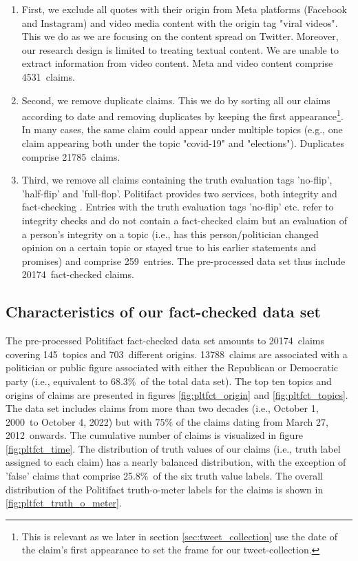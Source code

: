 \documentclass[
10pt, %
a4paper, %
oneside, %
headinclude,footinclude, %
] {book}%
\newcommand{\pltfctMETA}{4531}
\newcommand{\pltfctDUPS}{21785}
\newcommand{\pltfctFLIPFLOP}{259}
\newcommand{\pltfctTOTAL}{20174}
\newcommand{\pltfctTOPICS}{145}
\newcommand{\pltfctORIGINS}{703}
\newcommand{\pltfctFROMDATE}{October 1, 2000}
\newcommand{\pltfctTODATE}{October 4, 2022}
\newcommand{\pltfctMOSTDATE}{March 27, 2012}
\newcommand{\pltfctDEMREPS}{13788}
\newcommand{\pltfctDEMREPSPCT}{68.3\%}
\newcommand{\pltfctFALSECLAIMSPCT}{25.8\%}
\begin{document}
\begin{enumerate}
    \item First, we exclude all quotes with their origin from Meta platforms (Facebook and Instagram) and video media content with the origin tag "viral videos". This we do as we are focusing on the content spread on Twitter. Moreover, our research design is limited to treating textual content. We are unable to extract information from video content. Meta and video content comprise \pltfctMETA\ claims.
    \item Second, we remove duplicate claims. This we do by sorting all our claims according to date and removing duplicates by keeping the first appearance\footnote{This is relevant as we later in section \ref{sec:tweet_collection} use the date of the claim's first appearance to set the frame for our tweet-collection.}. In many cases, the same claim could appear under multiple topics (e.g., one claim appearing both under the topic "covid-19" and "elections"). Duplicates comprise \pltfctDUPS\ claims.
    \item Third, we remove all claims containing the truth evaluation tags 'no-flip', 'half-flip' and 'full-flop'. Politifact provides two services, both integrity and fact-checking \citep{politifact_methodology}. Entries with the truth evaluation tags 'no-flip' etc. refer to integrity checks and do not contain a fact-checked claim but an evaluation of a person's integrity on a topic (i.e., has this person/politician changed opinion on a certain topic or stayed true to his earlier statements and promises) and comprise \pltfctFLIPFLOP\ entries. The pre-processed data set thus include \pltfctTOTAL\ fact-checked claims.
\end{enumerate}
  

\subsection{Characteristics of our fact-checked data set}
\label{subsec:fact-checked_data_set}

The pre-processed Politifact fact-checked data set amounts to \pltfctTOTAL\ claims covering \pltfctTOPICS\ topics and \pltfctORIGINS\ different origins. \pltfctDEMREPS\ claims are associated with a politician or public figure associated with either the Republican or Democratic party (i.e., equivalent to \pltfctDEMREPSPCT\ of the total data set). The top ten topics and origins of claims are presented in figures \ref{fig:pltfct_origin} and \ref{fig:pltfct_topics}. The data set includes claims from more than two decades (i.e., \pltfctFROMDATE\ to \pltfctTODATE\.) but with 75\% of the claims dating from \pltfctMOSTDATE\ onwards. The cumulative number of claims is visualized in figure \ref{fig:pltfct_time}. The distribution of truth values of our claims (i.e., truth label assigned to each claim) has a nearly balanced distribution, with the exception of 'false' claims that comprise \pltfctFALSECLAIMSPCT\ of the six truth value labels. The overall distribution of the Politifact truth-o-meter labels for the claims is shown in \ref{fig:pltfct_truth_o_meter}.
\end{document}
